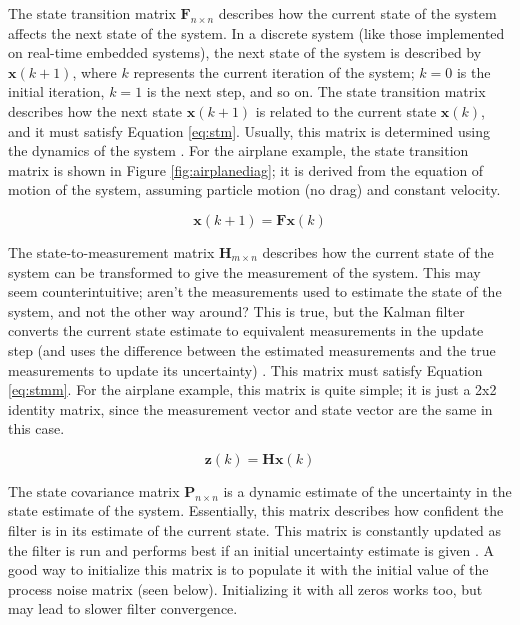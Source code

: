 \documentclass[12pt,a4paper]{report}
\begin{document}
The state transition matrix \(\mathbf{F}_{n \times n}\) describes how the current state of the system affects the next state of the system. In a discrete system (like those implemented on real-time embedded systems), the next state of the system is described by \(\mathbf{x}(k+1)\), where \(k\) represents the current iteration of the system; \(k=0\) is the initial iteration, \(k=1\) is the next step, and so on. The state transition matrix describes how the next state \(\mathbf{x}(k+1)\) is related to the current state \(\mathbf{x}(k)\), and it must satisfy Equation \ref{eq:stm}. Usually, this matrix is determined using the dynamics of the system \cite{kfsimply}. For the airplane example, the state transition matrix is shown in Figure \ref{fig:airplanediag}; it is derived from the equation of motion of the system, assuming particle motion (no drag) and constant velocity.

\begin{equation} \label{eq:stm}
	\mathbf{x}(k+1) = \mathbf{F} \mathbf{x}(k)
\end{equation}

The state-to-measurement matrix \(\mathbf{H}_{m \times n}\) describes how the current state of the system can be transformed to give the measurement of the system. This may seem counterintuitive; aren’t the measurements used to estimate the state of the system, and not the other way around? This is true, but the Kalman filter converts the current state estimate to equivalent measurements in the update step (and uses the difference between the estimated measurements and the true measurements to update its uncertainty) \cite{kfsimply}. This matrix must satisfy Equation \ref{eq:stmm}. For the airplane example, this matrix is quite simple; it is just a 2x2 identity matrix, since the measurement vector and state vector are the same in this case.

\begin{equation} \label{eq:stmm}
	\mathbf{z}(k) = \mathbf{H} \mathbf{x}(k)
\end{equation}

The state covariance matrix \(\mathbf{P}_{n \times n}\) is a dynamic estimate of the uncertainty in the state estimate of the system. Essentially, this matrix describes how confident the filter is in its estimate of the current state. This matrix is constantly updated as the filter is run and performs best if an initial uncertainty estimate is given \cite{kfsimply}. A good way to initialize this matrix is to populate it with the initial value of the process noise matrix (seen below). Initializing it with all zeros works too, but may lead to slower filter convergence.
\end{document}
